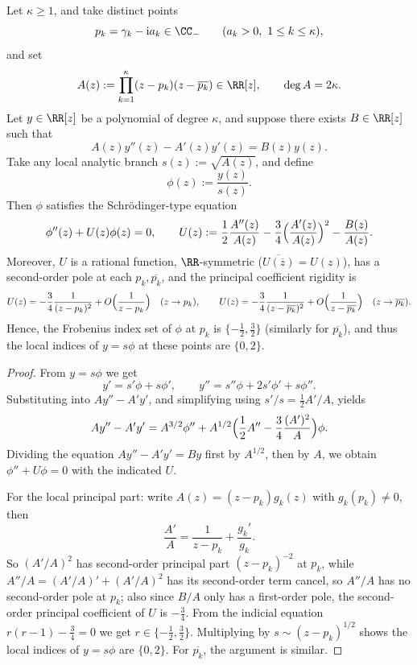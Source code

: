\begin{conclusion}\label{con:xi-terminal-heine-stieltjes-schrodinger-reduction-local-exponent-rigidity}
Let \(\kappa\ge 1\), and take distinct points
\[
p_k=\gamma_k-\mathrm{i}a_k\in\CC_{-}\qquad(a_k>0,\ 1\le k\le \kappa),
\]
and set
\[
A(z):=\prod_{k=1}^{\kappa}(z-p_k)(z-\overline{p_k})\in\RR[z],
\qquad
\deg A=2\kappa.
\]
Let \(y\in\RR[z]\) be a polynomial of degree \(\kappa\), and suppose there exists \(B\in\RR[z]\) such that
\[
A(z)y''(z)-A'(z)y'(z)=B(z)y(z).
\]
Take any local analytic branch \(s(z):=\sqrt{A(z)}\), and define
\[
\phi(z):=\frac{y(z)}{s(z)}.
\]
Then \(\phi\) satisfies the Schr\"odinger-type equation
\[
\phi''(z)+U(z)\phi(z)=0,
\qquad
U(z):=\frac{1}{2}\frac{A''(z)}{A(z)}-\frac{3}{4}\Bigl(\frac{A'(z)}{A(z)}\Bigr)^2-\frac{B(z)}{A(z)}.
\]
Moreover, \(U\) is a rational function, \(\RR\)-symmetric (\(\overline{U(\overline z)}=U(z)\)), has a second-order pole at each \(p_k,\overline{p_k}\), and the principal coefficient rigidity is
\[
U(z)=-\frac{3}{4}\frac{1}{(z-p_k)^2}+O\Bigl(\frac{1}{z-p_k}\Bigr)\quad(z\to p_k),
\qquad
U(z)=-\frac{3}{4}\frac{1}{(z-\overline{p_k})^2}+O\Bigl(\frac{1}{z-\overline{p_k}}\Bigr)\quad(z\to\overline{p_k}).
\]
Hence, the Frobenius index set of \(\phi\) at \(p_k\) is \(\{-\tfrac12,\tfrac32\}\) (similarly for \(\overline{p_k}\)), and thus the local indices of \(y=s\phi\) at these points are \(\{0,2\}\).
\end{conclusion}
\begin{proof}
From \(y=s\phi\) we get
\[
y'=s'\phi+s\phi',\qquad
y''=s''\phi+2s'\phi'+s\phi''.
\]
Substituting into \(Ay''-A'y'\), and simplifying using \(s'/s=\tfrac12 A'/A\), yields
\[
Ay''-A'y'
=A^{3/2}\phi''+A^{1/2}\Bigl(\frac12A''-\frac34\frac{(A')^2}{A}\Bigr)\phi.
\]
Dividing the equation \(Ay''-A'y'=By\) first by \(A^{1/2}\), then by \(A\), we obtain \(\phi''+U\phi=0\) with the indicated \(U\).
\par
For the local principal part: write \(A(z)=(z-p_k)g_k(z)\) with \(g_k(p_k)\neq 0\), then
\[
\frac{A'}{A}=\frac{1}{z-p_k}+\frac{g_k'}{g_k}.
\]
So \((A'/A)^2\) has second-order principal part \((z-p_k)^{-2}\) at \(p_k\), while
\(
A''/A=(A'/A)'+(A'/A)^2
\)
has its second-order term cancel, so \(A''/A\) has no second-order pole at \(p_k\); also since \(B/A\) only has a first-order pole, the second-order principal coefficient of \(U\) is \(-\tfrac34\).
From the indicial equation \(r(r-1)-\tfrac34=0\) we get \(r\in\{-\tfrac12,\tfrac32\}\).
Multiplying by \(s\sim (z-p_k)^{1/2}\) shows the local indices of \(y=s\phi\) are \(\{0,2\}\).
For \(\overline{p_k}\), the argument is similar.
\end{proof}

